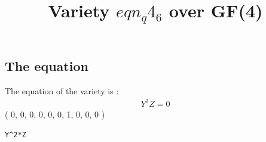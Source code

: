 \documentclass{article}
\newcommand\setTBstruts{\def\T{\rule{0pt}{2.6ex}}%
\def\B{\rule[-1.2ex]{0pt}{0pt}}}
\begin{document}
 
\setTBstruts



{\allowdisplaybreaks%






\title{Variety $eqn_q4_6$ over GF(4)}
\author{}%
\maketitle%
%



\subsection*{The equation}
The equation of the variety  is :
{\renewcommand{\arraystretch}{1.5}
$$
\begin{array}{c}
Y^2Z=0
\end{array}
$$}
( 0, 0, 0, 0, 0, 0, 1, 0, 0, 0 )\\
\begin{verbatim}
Y^2*Z
\end{verbatim}
}
\end{document}
